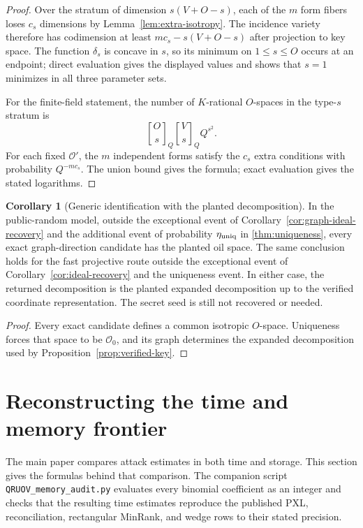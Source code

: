 \documentclass[11pt,a4paper]{article}
\theoremstyle{definition}
\newtheorem{corollary}[theorem]{Corollary}
\theoremstyle{remark}
\newcommand{\cO}{\mathcal O}
\begin{document}
\begin{proof}
Over the stratum of dimension $s(V+O-s)$, each of the $m$ form fibers loses $c_s$ dimensions by Lemma~\ref{lem:extra-isotropy}.  The incidence variety therefore has codimension at least $mc_s-s(V+O-s)$ after projection to key space.  The function $\delta_s$ is concave in $s$, so its minimum on $1\le s\le O$ occurs at an endpoint; direct evaluation gives the displayed values and shows that $s=1$ minimizes in all three parameter sets.

For the finite-field statement, the number of $K$-rational $O$-spaces in the type-$s$ stratum is
\[
\genfrac{[}{]}{0pt}{}{O}{s}_Q
\genfrac{[}{]}{0pt}{}{V}{s}_Q Q^{s^2}.
\]
For each fixed $\cO'$, the $m$ independent forms satisfy the $c_s$ extra conditions with probability $Q^{-mc_s}$.  The union bound gives the formula; exact evaluation gives the stated logarithms.
\end{proof}

\begin{corollary}[Generic identification with the planted decomposition]\label{cor:planted-identification}
In the public-random model, outside the exceptional event of Corollary~\ref{cor:graph-ideal-recovery} and the additional event of probability $\eta_{\rm uniq}$ in \cref{thm:uniqueness}, every exact graph-direction candidate has the planted oil space.  The same conclusion holds for the fast projective route outside the exceptional event of Corollary~\ref{cor:ideal-recovery} and the uniqueness event.  In either case, the returned decomposition is the planted expanded decomposition up to the verified coordinate representation.  The secret seed is still not recovered or needed.
\end{corollary}

\begin{proof}
Every exact candidate defines a common isotropic $O$-space.  Uniqueness forces that space to be $\cO_0$, and its graph determines the expanded decomposition used by Proposition~\ref{prop:verified-key}.
\end{proof}

\section{Reconstructing the time and memory frontier}\label{app:memory-frontier}

The main paper compares attack estimates in both time and storage.  This
section gives the formulas behind that comparison.  The companion script
\texttt{QRUOV\_memory\_audit.py} evaluates every binomial coefficient as an
integer and checks that the resulting time estimates reproduce the published
PXL, reconciliation, rectangular MinRank, and wedge rows to their stated
precision.
\end{document}
